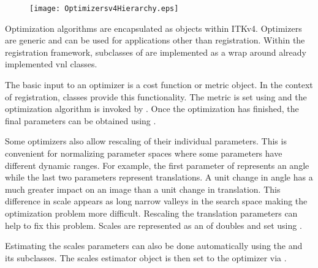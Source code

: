 


\begin{figure}
\center
\texttt{[image: Optimizersv4Hierarchy.eps]}
\label{fig:Optimizersv4Hierarchy}
\end{figure}

Optimization algorithms are encapsulated as 
objects within ITKv4. Optimizers are generic and can be used for applications
other than registration. Within the registration framework, subclasses of
 are implemented as a wrap
around already implemented vnl classes.


The basic input to an optimizer is a cost function or metric object. In the context
of registration,  classes provide this functionality.
The metric is set using  and
the optimization algorithm is invoked by .
Once the optimization has finished, the final parameters can be obtained
using .

Some optimizers also allow rescaling of their individual parameters. This is
convenient for normalizing parameter spaces where some parameters have
different dynamic ranges. For example, the first parameter of
 represents an angle while the last two parameters
represent translations. A unit change in angle has a much greater impact on an
image than a unit change in translation. This difference in scale appears as
long narrow valleys in the search space making the optimization problem more
difficult. Rescaling the translation parameters can help to fix this problem.
Scales are represented as an  of doubles and set using
.

Estimating the scales parameters can also be done automatically using the
 and its subclasses.
The scales estimator object is then set to the optimizer via
.

